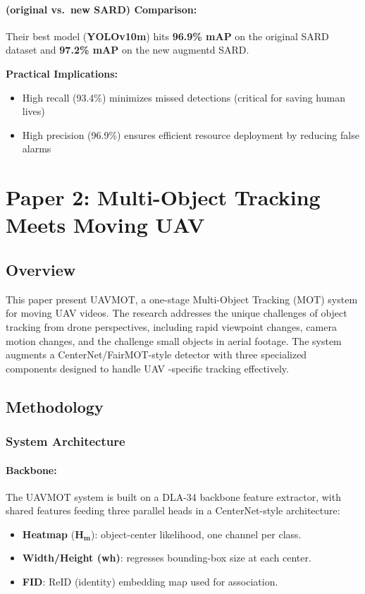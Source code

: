 \documentclass[12pt,a4paper]{report}
\begin{document}
\paragraph{(original vs.\ new SARD) Comparison:}
Their best model (\textbf{YOLOv10m}) hits \textbf{96.9\% mAP} on the original SARD dataset and \textbf{97.2\% mAP} on the new augmentd SARD.




\vspace{1.5cm}
\textbf{Practical Implications:}
\begin{itemize}
    \item High recall (93.4\%) minimizes missed detections (critical for saving human lives)
    \item High precision (96.9\%) ensures efficient resource deployment by reducing false alarms
\end{itemize}

\section{Paper 2: Multi-Object Tracking Meets Moving UAV}

\subsection{Overview}
This paper present UAVMOT, a one-stage Multi-Object Tracking (MOT) system  for moving UAV videos. The research addresses the unique challenges of object tracking from drone perspectives, including rapid viewpoint changes, camera motion changes, and the challenge small objects in aerial footage. The system augments a CenterNet/FairMOT-style detector with three specialized components designed to handle UAV -specific tracking effectively.

\subsection{Methodology}

\subsubsection{System Architecture}

\paragraph{Backbone:}
The UAVMOT system is built on a DLA-34 backbone feature extractor, with shared features feeding three parallel heads in a CenterNet-style architecture:
\begin{itemize}
  \item \textbf{Heatmap} ($\mathbf{H_m}$): object-center likelihood, one channel per class.
  \item \textbf{Width/Height (wh)}: regresses bounding-box size at each center.
  \item \textbf{FID}: ReID (identity) embedding map used for association.
\end{itemize}
\end{document}
